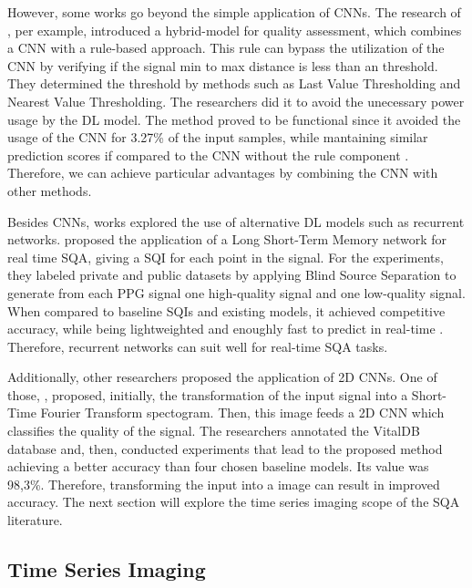 However, some works go beyond the simple application of \gls{CNN}s. The research of \citeauthor{review-10}, per example, introduced a hybrid-model for quality assessment, which combines a \gls{CNN} with a rule-based approach. This rule can bypass the utilization of the \gls{CNN} by verifying if the signal min to max distance is less than an threshold. They determined the threshold by methods such as Last Value Thresholding and Nearest Value Thresholding. The researchers did it to avoid the unecessary power usage by the \gls{DL} model. The method proved to be functional since it avoided the usage of the \gls{CNN} for 3.27\% of the input samples, while mantaining similar prediction scores if compared to the \gls{CNN} without the rule component \cite{review-10}. Therefore, we can achieve particular advantages by combining the \gls{CNN} with other methods.  

Besides \gls{CNN}s, works explored the use of alternative \gls{DL} models such as recurrent networks. \citeauthor{review-11} proposed the application of a Long Short-Term Memory network for real time \gls{SQA}, giving a \gls{SQI} for each point in the signal. For the experiments, they labeled private and public datasets by applying Blind Source Separation to generate from each \gls{PPG} signal one high-quality signal and one low-quality signal. When compared to baseline \gls{SQI}s and existing models, it achieved competitive accuracy, while being lightweighted and enoughly fast to predict in real-time \cite{review-11}. Therefore, recurrent networks can suit well for real-time \gls{SQA} tasks.

Additionally, other researchers proposed the application of 2D \gls{CNN}s. One of those, \citeauthor{review-12}, proposed, initially, the transformation of the input signal into a Short-Time Fourier Transform spectogram. Then, this image feeds a 2D \gls{CNN} which classifies the quality of the signal. The researchers annotated the VitalDB database and, then, conducted experiments that lead to the proposed method achieving a better accuracy than four chosen baseline models. Its value was 98,3\%. Therefore, transforming the input into a image can result in improved accuracy. The next section will explore the time series imaging scope of the \gls{SQA} literature.




\subsection{Time Series Imaging}
\label{sec:imaging}


